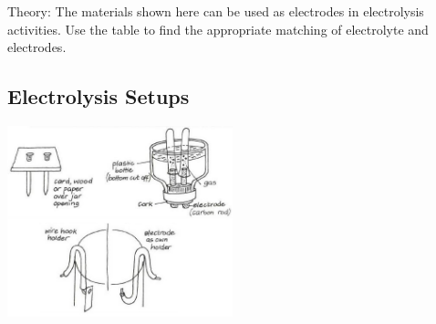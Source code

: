 \begin{multicols}{2}
\begin{description*}
\item[Theory:]{The materials shown here can be used as electrodes in electrolysis activities. Use the table to find the appropriate matching of electrolyte and electrodes.}
\end{description*}

%
%

\subsection{Electrolysis Setups}

\begin{center}
\includegraphics[width=0.49\textwidth]{./img/vso/electrolysis.jpg}
\end{center}


\end{multicols}
